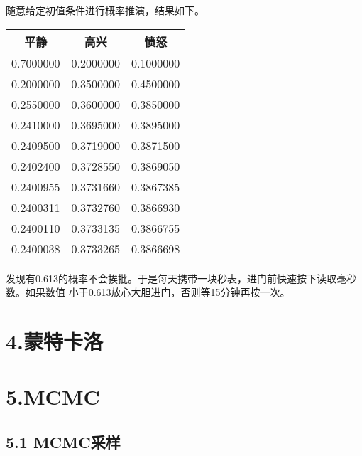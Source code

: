 \documentclass[]{article}
\newenvironment{Shaded}{\begin{snugshade}}{\end{snugshade}}
\newcommand{\KeywordTok}[1]{\textcolor[rgb]{0.13,0.29,0.53}{\textbf{#1}}}
\newcommand{\DataTypeTok}[1]{\textcolor[rgb]{0.13,0.29,0.53}{#1}}
\newcommand{\DecValTok}[1]{\textcolor[rgb]{0.00,0.00,0.81}{#1}}
\newcommand{\FloatTok}[1]{\textcolor[rgb]{0.00,0.00,0.81}{#1}}
\newcommand{\StringTok}[1]{\textcolor[rgb]{0.31,0.60,0.02}{#1}}
\newcommand{\CommentTok}[1]{\textcolor[rgb]{0.56,0.35,0.01}{\textit{#1}}}
\newcommand{\OtherTok}[1]{\textcolor[rgb]{0.56,0.35,0.01}{#1}}
\newcommand{\ControlFlowTok}[1]{\textcolor[rgb]{0.13,0.29,0.53}{\textbf{#1}}}
\newcommand{\OperatorTok}[1]{\textcolor[rgb]{0.81,0.36,0.00}{\textbf{#1}}}
\newcommand{\NormalTok}[1]{#1}
\begin{document}
随意给定初值条件进行概率推演，结果如下。

\begin{Shaded}
\end{Shaded}

\begin{longtable}[]{@{}ccc@{}}
\toprule
平静 & 高兴 & 愤怒\tabularnewline
\midrule
\endhead
0.7000000 & 0.2000000 & 0.1000000\tabularnewline
0.2000000 & 0.3500000 & 0.4500000\tabularnewline
0.2550000 & 0.3600000 & 0.3850000\tabularnewline
0.2410000 & 0.3695000 & 0.3895000\tabularnewline
0.2409500 & 0.3719000 & 0.3871500\tabularnewline
0.2402400 & 0.3728550 & 0.3869050\tabularnewline
0.2400955 & 0.3731660 & 0.3867385\tabularnewline
0.2400311 & 0.3732760 & 0.3866930\tabularnewline
0.2400110 & 0.3733135 & 0.3866755\tabularnewline
0.2400038 & 0.3733265 & 0.3866698\tabularnewline
\bottomrule
\end{longtable}

发现有0.613的概率不会挨批。于是每天携带一块秒表，进门前快速按下读取毫秒数。如果数值
小于0.613放心大胆进门，否则等15分钟再按一次。

\section{4.蒙特卡洛}

\section{5.MCMC}\label{mcmc}

\subsection{5.1 MCMC采样}\label{mcmc}
\end{document}
